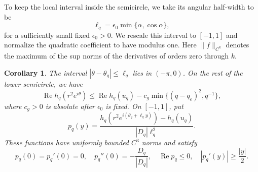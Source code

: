 \documentclass[11pt,reqno]{amsart}
\numberwithin{equation}{section}
\newtheorem{corollary}[theorem]{Corollary}
\renewcommand{\Re}{\operatorname{Re}}
\begin{document}
To keep the local interval inside the semicircle, we take its
angular half-width to be
\begin{equation}\label{eq:ell-definition}
 \ell_q=\epsilon_0\min\{\alpha,\cos\alpha\},
\end{equation}
for a sufficiently small fixed $\epsilon_0>0$. We rescale this
interval to $[-1,1]$ and normalize the quadratic coefficient to
have modulus one. Here $\|f\|_{C^k}$ denotes the maximum of the
sup norms of the derivatives of orders zero through $k$.

\begin{corollary}\label{cor:local-geometry}
The interval $|\theta-\theta_q|\le\ell_q$ lies in $(-\pi,0)$.
On the rest of the lower semicircle, we have
\begin{equation}\label{eq:discard-gap}
 \Re h_q(r^2e^{i\theta})
 \le\Re h_q(u_q)-c_g\min\{(q-q_e)^2,q^{-1}\},
\end{equation}
where $c_g>0$ is absolute after $\epsilon_0$ is fixed. On $[-1,1]$, put
\begin{equation}\label{eq:p-definition}
 p_q(y)=\frac{h_q(r^2e^{i(\theta_q+\ell_qy)})-h_q(u_q)}
                   {|D_q|\ell_q^2}.
\end{equation}
These functions have uniformly bounded $C^3$ norms and satisfy
\begin{equation}\label{eq:p-properties}
 p_q(0)=p_q'(0)=0,\quad
 p_q''(0)=-\frac{D_q}{|D_q|},\quad
 \Re p_q\le0,\quad |p_q'(y)|\ge\frac{|y|}{2}.
\end{equation}
\end{corollary}
\end{document}
